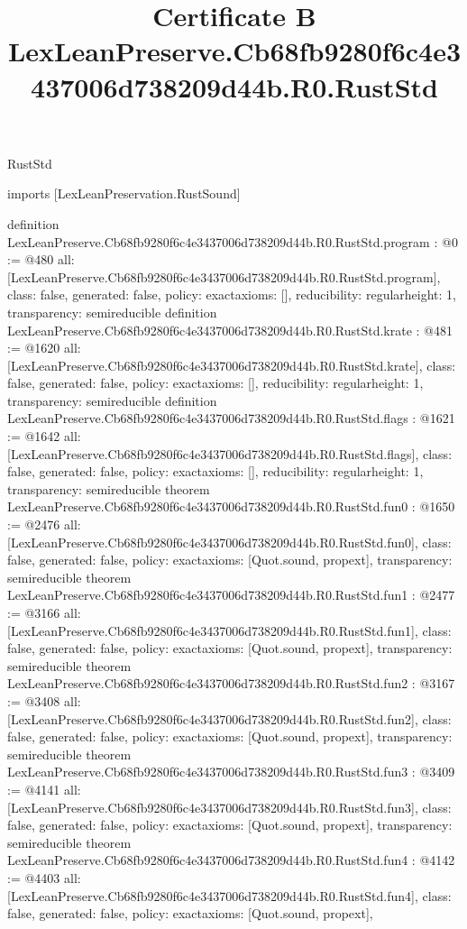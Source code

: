 \begin{lexlean}{RustStd}
\title{Certificate B LexLeanPreserve.Cb68fb9280f6c4e3437006d738209d44b.R0.RustStd}
\begin{coremodule}
imports [LexLeanPreservation.RustSound]

definition LexLeanPreserve.Cb68fb9280f6c4e3437006d738209d44b.R0.RustStd.program : @0 := @480 {
  all: [LexLeanPreserve.Cb68fb9280f6c4e3437006d738209d44b.R0.RustStd.program],
  class: false,
  generated: false,
  policy: exact{axioms: []},
  reducibility: regular{height: 1},
  transparency: semireducible
}
definition LexLeanPreserve.Cb68fb9280f6c4e3437006d738209d44b.R0.RustStd.krate : @481 := @1620 {
  all: [LexLeanPreserve.Cb68fb9280f6c4e3437006d738209d44b.R0.RustStd.krate],
  class: false,
  generated: false,
  policy: exact{axioms: []},
  reducibility: regular{height: 1},
  transparency: semireducible
}
definition LexLeanPreserve.Cb68fb9280f6c4e3437006d738209d44b.R0.RustStd.flags : @1621 := @1642 {
  all: [LexLeanPreserve.Cb68fb9280f6c4e3437006d738209d44b.R0.RustStd.flags],
  class: false,
  generated: false,
  policy: exact{axioms: []},
  reducibility: regular{height: 1},
  transparency: semireducible
}
theorem LexLeanPreserve.Cb68fb9280f6c4e3437006d738209d44b.R0.RustStd.fun0 : @1650 := @2476 {
  all: [LexLeanPreserve.Cb68fb9280f6c4e3437006d738209d44b.R0.RustStd.fun0],
  class: false,
  generated: false,
  policy: exact{axioms: [Quot.sound, propext]},
  transparency: semireducible
}
theorem LexLeanPreserve.Cb68fb9280f6c4e3437006d738209d44b.R0.RustStd.fun1 : @2477 := @3166 {
  all: [LexLeanPreserve.Cb68fb9280f6c4e3437006d738209d44b.R0.RustStd.fun1],
  class: false,
  generated: false,
  policy: exact{axioms: [Quot.sound, propext]},
  transparency: semireducible
}
theorem LexLeanPreserve.Cb68fb9280f6c4e3437006d738209d44b.R0.RustStd.fun2 : @3167 := @3408 {
  all: [LexLeanPreserve.Cb68fb9280f6c4e3437006d738209d44b.R0.RustStd.fun2],
  class: false,
  generated: false,
  policy: exact{axioms: [Quot.sound, propext]},
  transparency: semireducible
}
theorem LexLeanPreserve.Cb68fb9280f6c4e3437006d738209d44b.R0.RustStd.fun3 : @3409 := @4141 {
  all: [LexLeanPreserve.Cb68fb9280f6c4e3437006d738209d44b.R0.RustStd.fun3],
  class: false,
  generated: false,
  policy: exact{axioms: [Quot.sound, propext]},
  transparency: semireducible
}
theorem LexLeanPreserve.Cb68fb9280f6c4e3437006d738209d44b.R0.RustStd.fun4 : @4142 := @4403 {
  all: [LexLeanPreserve.Cb68fb9280f6c4e3437006d738209d44b.R0.RustStd.fun4],
  class: false,
  generated: false,
  policy: exact{axioms: [Quot.sound, propext]},
}
\end{coremodule}
\end{lexlean}
